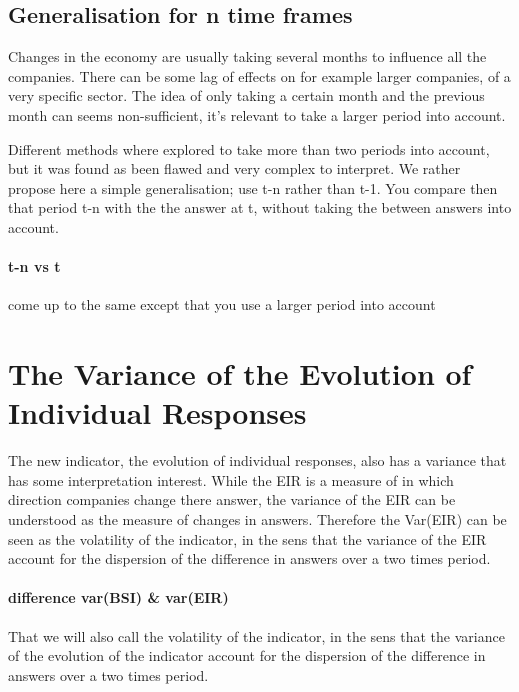 \documentclass[12pt,a4paper,oneside]{book}
\begin{document}
\section{Generalisation for n time frames}

Changes in the economy are usually taking several months to influence all the companies. There can be some lag of effects on for example larger companies, of a very specific sector.
The idea of only taking a certain month and the previous month can seems non-sufficient, it's relevant to take a larger period into account. 

Different methods where explored to take more than two periods into account, but it was found as been flawed and very complex to interpret.
We rather propose here a simple generalisation; use t-n rather than t-1. You compare then that period t-n with the the answer at t, without taking the between answers into account.

\subsubsection{t-n vs t}

come up to the same except that you use a larger period into account


\chapter{The Variance of the Evolution of Individual Responses} \label{Chapter:Var Z}

The new indicator, the evolution of individual responses, also has a variance that has some interpretation interest. 
While the EIR is a measure of in which direction companies change there answer, the variance of the EIR can be understood as the measure of changes in answers. Therefore the Var(EIR) can be seen as the volatility of the indicator, in the sens that the variance of the EIR account for the dispersion of the difference in answers over a two times period.

\subsubsection{difference var(BSI) \& var(EIR)}

That we will also call the volatility of the indicator, in the sens that the variance of the evolution of the indicator account for the dispersion of the difference in answers over a two times period.

\end{document}
